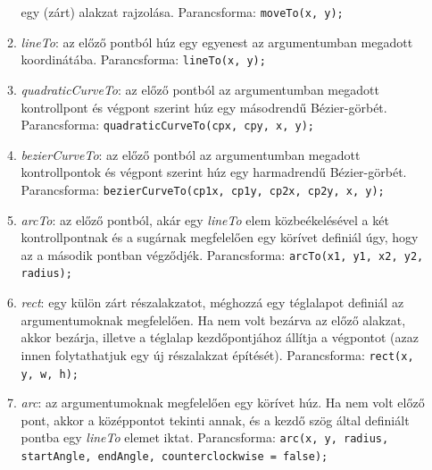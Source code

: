 \documentclass[12pt]{report}
\theoremstyle{definition}
\begin{document}
\begin{enumerate}[I.]
\begin{enumerate}
      egy (zárt) alakzat rajzolása. Parancsforma:\newline
        \texttt{moveTo(x, y);}
      \item \emph{lineTo}: az előző pontból húz egy egyenest az
      argumentumban megadott koordinátába. Parancsforma:\newline
        \texttt{lineTo(x, y);}
      \item \emph{quadraticCurveTo}: az előző pontból az
      argumentumban megadott kontrollpont és végpont szerint húz
      egy másodrendű Bézier-görbét. Parancsforma:\newline
        \texttt{quadraticCurveTo(cpx, cpy, x, y);}
      \item \emph{bezierCurveTo}: az előző pontból az
      argumentumban megadott kontrollpontok és végpont szerint húz
      egy harmadrendű Bézier-görbét. Parancsforma:\newline
        \texttt{bezierCurveTo(cp1x, cp1y, cp2x, cp2y, x, y);}
      \item \emph{arcTo}: az előző pontból, akár egy
      \emph{lineTo} elem közbeékelésével a két kontrollpontnak
      és a sugárnak megfelelően egy körívet definiál úgy,
      hogy az a második pontban végződjék. Parancsforma:\newline
        \texttt{arcTo(x1, y1, x2, y2, radius);}
      \item \emph{rect}: egy külön zárt részalakzatot,
      méghozzá egy téglalapot definiál az argumentumoknak
      megfelelően. Ha nem volt bezárva az előző alakzat, akkor
      bezárja, illetve a téglalap kezdőpontjához állítja a
      végpontot (azaz innen folytathatjuk egy új részalakzat
      építését). Parancsforma:\newline
        \texttt{rect(x, y, w, h);}
      \item \emph{arc}: az argumentumoknak megfelelően egy
      körívet húz. Ha nem volt előző pont, akkor a
      középpontot tekinti annak, és a kezdő szög által
      definiált pontba egy \emph{lineTo} elemet iktat.
      Parancsforma:\newline
        \texttt{arc(x, y, radius, startAngle, endAngle, counterclockwise = false);}
    \end{enumerate}
\end{enumerate}
\end{document}

